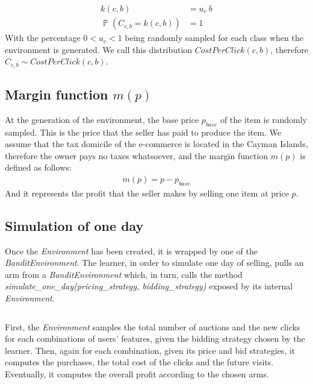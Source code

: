 \documentclass[11pt]{article} %
\DeclareMathOperator{\Prob}{\mathbb{P}}
\begin{document}
\begin{align*}
k(c,b) &= u_c\  b\\
\Prob(C_{c,b} = k(c,b)) &= 1
\end{align*}
With the percentage $0 < u_c < 1$ being randomly sampled for each class when the environment is generated.
We call this distribution $CostPerClick(c,b)$, therefore $C_{c,b}\sim CostPerClick(c,b)$.

\subsection{Margin function $m(p)$}
At the generation of the environment, the base price $p_{base}$ of the item is randomly sampled. This is the price that the seller has paid to produce the item. We assume that the tax domicile of the e-commerce is located in the Cayman Islands, therefore the owner pays no taxes whatsoever, and the margin function $m(p)$ is defined as follows:
\begin{align*}
m(p)=p-p_{base}
\end{align*}
And it represents the profit that the seller makes by selling one item at price $p$.

\subsection{Simulation of one day}
Once the \textit{Environment} has been created, it is wrapped by one of the \textit{BanditEnvironment}.  The learner, in order to simulate one day of selling, pulls an arm from a \textit{BanditEnvironment} which, in turn, calls the method \textit{simulate\_one\_day(pricing\_strategy, bidding\_strategy)} exposed by its internal \textit{Environment}. 
\inputminted[fontsize=\footnotesize]{python}{code/simulation_one_day.py}
First, the \textit{Environment} samples the total number of auctions and the new clicks for each combinations of users' features, given the bidding strategy chosen by the learner. Then, again for each combination, given its price and bid strategies, it computes the purchases, the total cost of the clicks and the future visits. Eventually, it computes the overall profit according to the chosen arms.

\clearpage
\end{document}
